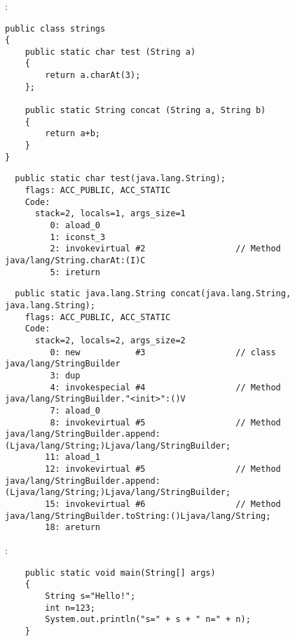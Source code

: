 \subsubsection{}

:

\begin{lstlisting}
public class strings
{
	public static char test (String a)
	{
		return a.charAt(3);
	};

	public static String concat (String a, String b)
	{
		return a+b;
	}
}
\end{lstlisting}

\begin{lstlisting}
  public static char test(java.lang.String);
    flags: ACC_PUBLIC, ACC_STATIC
    Code:
      stack=2, locals=1, args_size=1
         0: aload_0       
         1: iconst_3      
         2: invokevirtual #2                  // Method java/lang/String.charAt:(I)C
         5: ireturn       
\end{lstlisting}
         

\begin{lstlisting}
  public static java.lang.String concat(java.lang.String, java.lang.String);
    flags: ACC_PUBLIC, ACC_STATIC
    Code:
      stack=2, locals=2, args_size=2
         0: new           #3                  // class java/lang/StringBuilder
         3: dup           
         4: invokespecial #4                  // Method java/lang/StringBuilder."<init>":()V
         7: aload_0       
         8: invokevirtual #5                  // Method java/lang/StringBuilder.append:(Ljava/lang/String;)Ljava/lang/StringBuilder;
        11: aload_1       
        12: invokevirtual #5                  // Method java/lang/StringBuilder.append:(Ljava/lang/String;)Ljava/lang/StringBuilder;
        15: invokevirtual #6                  // Method java/lang/StringBuilder.toString:()Ljava/lang/String;
        18: areturn       
\end{lstlisting}

:

\begin{lstlisting}
	public static void main(String[] args)
	{
		String s="Hello!";
		int n=123;
		System.out.println("s=" + s + " n=" + n);
	}
\end{lstlisting}

